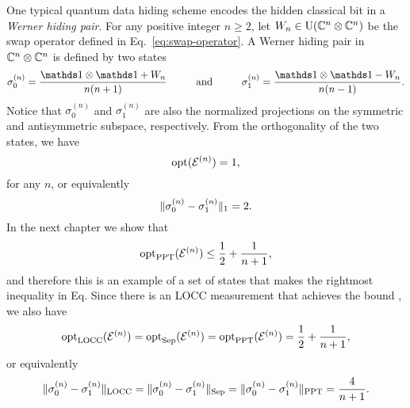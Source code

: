 \begin{example}
\label{example:werner-hiding-pairs}

One typical quantum data hiding scheme \cite{Terhal01a,DiVincenzo2002} encodes
the hidden classical bit in a \emph{Werner hiding pair}.
For any positive integer $n \geq 2$, let 
$W_{n} \in \mathrm{U}(\mathbb{C}^{n}\otimes\mathbb{C}^{n})$ be the swap operator 
defined in Eq.~\eqref{eq:swap-operator}. 
A Werner hiding pair in $\mathbb{C}^{n}\otimes\mathbb{C}^{n}$ is defined by two states 
\begin{equation}
  \label{eq:werner-states}
	\sigma_{0}^{(n)} = \frac{\I\otimes\I + W_{n}}{n(n+1)} 
		\hspace*{1cm}\mbox{and}\hspace*{1cm} 
	\sigma_{1}^{(n)} = \frac{\I\otimes\I - W_{n}}{n(n-1)}.
\end{equation}
Notice that $\sigma_{0}^{(n)}$ and $\sigma_{1}^{(n)}$ are also the normalized 
projections on the symmetric and antisymmetric subspace, respectively.
From the orthogonality of the two states, we have
\begin{equation}
	\operatorname{opt}(\mathcal{E}^{(n)}) = 1,
\end{equation}
for any $n$, or equivalently
\begin{equation}
  \lVert\sigma_{0}^{(n)} - \sigma_{1}^{(n)}\rVert_{1} = 2.
\end{equation}
In the next chapter we show that
\begin{equation}
  \operatorname{opt}_{\mathrm{PPT}}(\mathcal{E}^{(n)}) \leq \frac{1}{2} + \frac{1}{n+1},
\end{equation}
and therefore this is an example of a set of states that makes the rightmost
inequality in Eq.
Since there is an LOCC measurement that achieves the bound 
\cite{DiVincenzo2002}, we also have
\begin{equation}
  \operatorname{opt}_{\mathrm{LOCC}}(\mathcal{E}^{(n)}) = \operatorname{opt}_{\mathrm{Sep}}(\mathcal{E}^{(n)}) = \operatorname{opt}_{\mathrm{PPT}}(\mathcal{E}^{(n)}) = 
    \frac{1}{2} + \frac{1}{n+1},
\end{equation}
or equivalently
\begin{equation}
	\lVert\sigma_{0}^{(n)} - \sigma_{1}^{(n)}\rVert_{\mathrm{LOCC}} = 
    \lVert\sigma_{0}^{(n)} - \sigma_{1}^{(n)}\rVert_{\mathrm{Sep}} =
    \lVert\sigma_{0}^{(n)} - \sigma_{1}^{(n)}\rVert_{\mathrm{PPT}} = \frac{4}{n+1}.
\end{equation}
\end{example}



